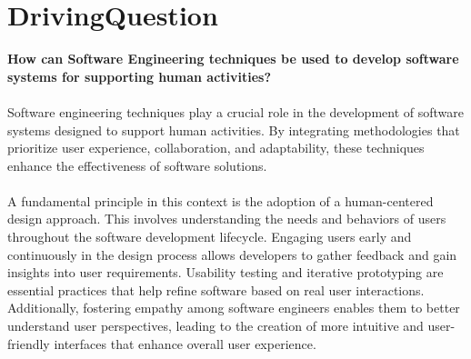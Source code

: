 \section{DrivingQuestion}


\textbf{How can Software Engineering techniques be used to develop software systems for supporting human activities?}
\\
\\
Software engineering techniques play a crucial role in the development of software systems designed to support human activities. By integrating methodologies that prioritize user experience, collaboration, and adaptability, these techniques enhance the effectiveness of software solutions.
\\
\\
A fundamental principle in this context is the adoption of a human-centered design approach. This involves understanding the needs and behaviors of users throughout the software development lifecycle. Engaging users early and continuously in the design process allows developers to gather feedback and gain insights into user requirements. Usability testing and iterative prototyping are essential practices that help refine software based on real user interactions. Additionally, fostering empathy among software engineers enables them to better understand user perspectives, leading to the creation of more intuitive and user-friendly interfaces that enhance overall user experience.